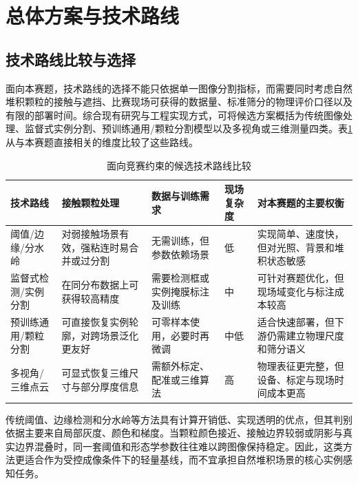 \section{总体方案与技术路线}
\label{sec:system-design}

\subsection{技术路线比较与选择}
\label{sec:route-selection}

面向本赛题，技术路线的选择不能只依据单一图像分割指标，而需要同时考虑自然堆积颗粒的接触与遮挡、比赛现场可获得的数据量、标准筛分的物理评价口径以及有限的部署时间。综合现有研究与工程实现方式，可将候选方案概括为传统图像处理、监督式实例分割、预训练通用/颗粒分割模型以及多视角或三维测量四类。表\ref{tab:route-comparison}从与本赛题直接相关的维度比较了这些路线。

\begin{table}[htbp]
\centering
\caption{面向竞赛约束的候选技术路线比较}
\label{tab:route-comparison}
\footnotesize
\renewcommand{\arraystretch}{1.15}
\begin{tabular}{>{\raggedright\arraybackslash}p{2.7cm}>{\raggedright\arraybackslash}p{2.8cm}>{\raggedright\arraybackslash}p{2.6cm}>{\raggedright\arraybackslash}p{2.4cm}>{\raggedright\arraybackslash}p{3.2cm}}
\toprule
技术路线 & 接触颗粒处理 & 数据与训练需求 & 现场复杂度 & 对本赛题的主要权衡 \\
\midrule
阈值/边缘/分水岭 & 对弱接触场景有效，强粘连时易合并或过分割 & 无需训练，但参数依赖场景 & 低 & 实现简单、速度快，但对光照、背景和堆积状态敏感 \\
监督式检测/实例分割 & 在同分布数据上可获得较高精度 & 需要检测框或实例掩膜标注及训练 & 中 & 可针对赛题优化，但现场域变化与标注成本较高 \\
预训练通用/颗粒分割 & 可直接恢复实例轮廓，对跨场景泛化更友好 & 可零样本使用，必要时再微调 & 中低 & 适合快速部署，但下游仍需建立物理尺度和筛分语义 \\
多视角/三维点云 & 可显式恢复三维尺寸与部分厚度信息 & 需额外标定、配准或三维算法 & 高 & 物理表征更完整，但设备、标定与现场时间成本更高 \\
\bottomrule
\end{tabular}
\end{table}

传统阈值、边缘检测和分水岭等方法具有计算开销低、实现透明的优点，但其判别依据主要来自局部灰度、颜色和梯度。当颗粒颜色接近、接触边界较弱或阴影与真实边界混叠时，同一套阈值和形态学参数往往难以跨图像保持稳定。因此，这类方法更适合作为受控成像条件下的轻量基线，而不宜承担自然堆积场景的核心实例感知任务。

